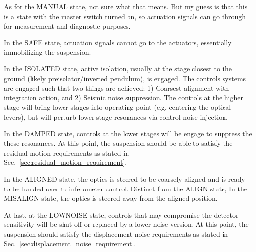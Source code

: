 As for the MANUAL state, not sure what that means.
But my guess is that this is a state with the master switch turned on, so actuation signals can go through for measurement and diagnostic purposes.

In the SAFE state, actuation signals cannot go to the actuators, essentially immobilizing the suspension.

In the ISOLATED state, active isolation, usually at the stage closest to the ground (likely preisolator/inverted pendulum), is engaged.
The controls systems are engaged such that two things are achieved: 1) Coarsest alignment with integration action, and 2) Seismic noise suppression.
The controls at the higher stage will bring lower stages into operating point (e.g. centering the optical levers), but will perturb lower stage resonances via control noise injection.

In the DAMPED state, controls at the lower stages will be engage to suppress the these resonances.
At this point, the suspension should be able to satisfy the residual motion requirements as stated in Sec.~\ref{sec:residual_motion_requirement}.

In the ALIGNED state, the optics is steered to be coarsely aligned and is ready to be handed over to inferometer control.
Distinct from the ALIGN state, In the MISALIGN state, the optics is steered away from the aligned position.

At last, at the LOWNOISE state, controls that may compromise the detector sensitivity will be shut off or replaced by a lower noise version.
At this point, the suspension should satisfy the displacement noise requirements as stated in Sec.~\ref{sec:displacement_noise_requirement}.


